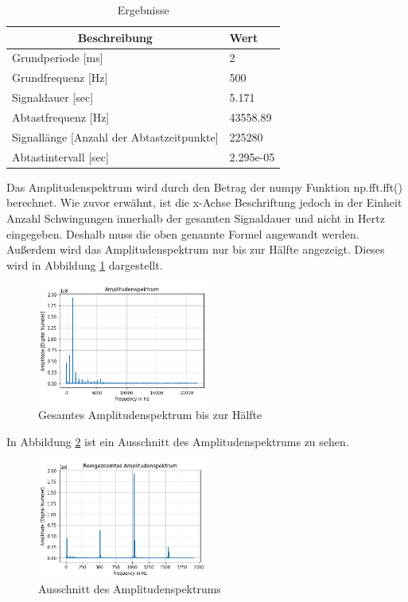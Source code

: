 \documentclass[12pt, oneside, a4paper, \docLanguage]{report}
\begin{document}
\begin{table}[H]
\center
\begin{tabular}{|l|l|}
\hline
\multicolumn{1}{|c|}{\textbf{Beschreibung}}   & \textbf{Wert} \\ \hline
Grundperiode {[}ms{]}                         & 2          \\ \hline
Grundfrequenz {[}Hz{]}                        & 500        \\ \hline
Signaldauer {[}sec{]}                         & 5.171     \\ \hline
Abtastfrequenz {[}Hz{]}                       & 43558.89   \\ \hline
Signallänge {[}Anzahl der Abtastzeitpunkte{]} & 225280        \\ \hline
Abtastintervall {[}sec{]}                     & 2.295e-05  \\ \hline
\end{tabular}
\caption{Ergebnisse}
\label{fig:VERSUCH_1_AUSWERTUNG_TABELLE}
\end{table}

Das Amplitudenspektrum wird durch den Betrag der numpy Funktion np.fft.fft() berechnet. Wie zuvor erwähnt, ist die x-Achse Beschriftung jedoch in der Einheit Anzahl Schwingungen innerhalb der gesamten Signaldauer und nicht in Hertz eingegeben. Deshalb muss die oben genannte Formel angewandt werden. Außerdem wird das Amplitudenspektrum nur bis zur Hälfte angezeigt. Dieses wird in Abbildung \ref{fig:VERSUCH_1_ASB} dargestellt.

\begin{figure}[H]
	\centering\small
	\includegraphics[width=0.5\textwidth]{media/AmplitudenspektrumBreit.png}
	\caption{Gesamtes Amplitudenspektrum bis zur Hälfte}
	\label{fig:VERSUCH_1_ASB}
\end{figure}

\newpage
In Abbildung \ref{fig:VERSUCH_1_ASS} ist ein Ausschnitt des Amplitudenspektrums zu sehen.

\begin{figure}[H]
	\centering\small
	\includegraphics[width=0.5\textwidth]{media/AmplitudenspektrumSchmal.png}
	\caption{Ausschnitt des Amplitudenspektrums}
	\label{fig:VERSUCH_1_ASS}
\end{figure}
\end{document}
